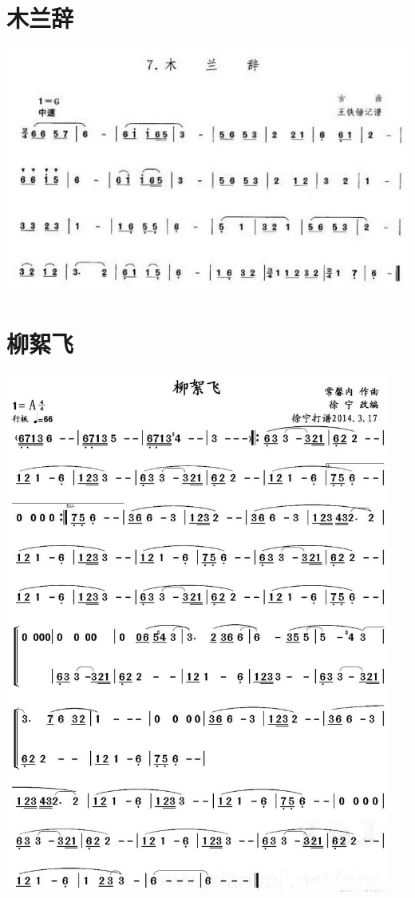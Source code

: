 \documentclass[cn,pad,chinesefont=nofont,twocol]{elegantbook}
\begin{document}
\section{木兰辞}\includegraphics[width=\textwidth]{dongxiao/20200819/木兰辞.jpeg}
\section{柳絮飞}\includegraphics[width=0.95\textwidth]{dongxiao/20200819/柳絮飞.jpg}
\end{document}
